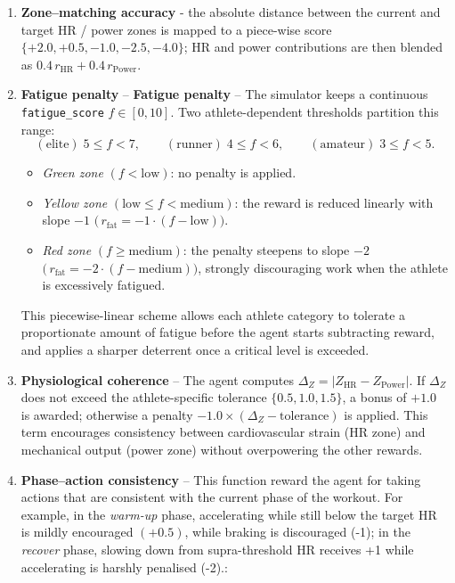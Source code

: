 \begin{enumerate}
  
  \item \textbf{Zone–matching accuracy} - the absolute distance between the current and target HR / power zones is mapped to a piece-wise score \(\{+2.0,+0.5,-1.0,-2.5,-4.0\}\); HR and power contributions are then blended as \(0.4\,r_{\text{HR}} + 0.4\,r_{\text{Power}}\).

  \item \textbf{Fatigue penalty} – \textbf{Fatigue penalty} – The simulator keeps a continuous \verb|fatigue_score| \(f \in [0,10]\). Two athlete-dependent thresholds partition this range:
    \[
    (\text{elite})\;5\le f<7,\qquad
    (\text{runner})\;4\le f<6,\qquad
    (\text{amateur})\;3\le f<5 .
    \]

    \begin{itemize}
    \item \emph{Green zone} \((f<\text{low})\): no penalty is applied.  
    \item \emph{Yellow zone} \((\text{low}\le f<\text{medium})\): the
            reward is reduced linearly with slope \(-1\)  
            \(\bigl(\,r_{\mathrm{fat}}=-1\cdot(f-\text{low})\bigr)\).
    \item \emph{Red zone} \((f\ge\text{medium})\): the penalty steepens to
            slope \(-2\)  
            \(\bigl(\,r_{\mathrm{fat}}=-2\cdot(f-\text{medium})\bigr)\),
            strongly discouraging work when the athlete is excessively
            fatigued.
    \end{itemize}

    This piecewise-linear scheme allows each athlete category to tolerate a proportionate amount of fatigue before the agent starts subtracting reward, and applies a sharper deterrent once a critical level is exceeded.


  \item \textbf{Physiological coherence} – The agent computes \(\Delta_Z=\lvert Z_{\text{HR}}-Z_{\text{Power}}\rvert\). If \(\Delta_Z\) does not exceed the athlete-specific tolerance \(\{0.5,1.0,1.5\}\), a bonus of \(+1.0\) is awarded; otherwise a penalty \(-1.0\times(\Delta_Z-\text{tolerance})\) is applied.  This term encourages consistency between cardiovascular strain (HR zone) and mechanical output (power zone) without overpowering the other rewards.

  \item \textbf{Phase–action consistency} – This function reward the agent for taking actions that are consistent with the current phase of the workout.  For example, in the \emph{warm-up} phase, accelerating while still below the target HR is mildly encouraged \((+0.5)\), while braking is discouraged (-1); in the \emph{recover} phase, slowing down from supra-threshold HR receives +1 while accelerating is harshly penalised (-2).:


\end{enumerate}
